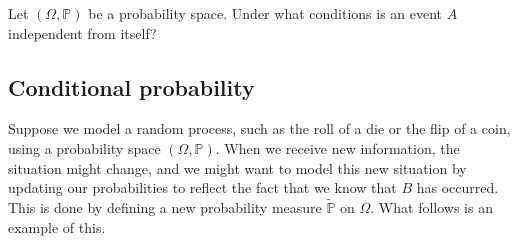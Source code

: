 \begin{exercise}
Let $(\Omega,\mathbb{P})$ be a probability space. Under what conditions is an event $A$ independent from itself?
\end{exercise}

\subsection*{Conditional probability}

Suppose we model a random process, such as the roll of a die or the flip of a coin, using a probability space $(\Omega,\mathbb{P})$. When we receive new information, the situation might change, and we might want to model this new situation by updating our probabilities to reflect the fact that we know that $B$ has occurred. This is done by defining a new probability measure $\widetilde{\mathbb{P}}$ on $\Omega$. What follows is an example of this.

